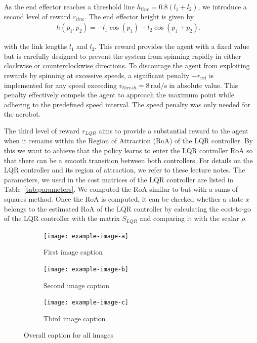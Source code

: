 As the end effector reaches a threshold line \(h_{line} = 0.8(l_1+l_2)\), we
introduce a second level of reward \(r_{line}\). The end effector height is
given by
\begin{align}
    h(p_1, p_2) = -l_1\cos(p_1) - l_2 \cos(p_1 + p_2).
\end{align}

with the link lengths $l_1$ and $l_2$.
This reward provides the agent with a fixed value
but is carefully designed to prevent the system from spinning rapidly in either
clockwise or counterclockwise directions. To discourage the agent from
exploiting rewards by spinning at excessive speeds, a significant penalty
\(-r_{vel}\) is implemented for any speed exceeding $v_{thresh}=8\,
\text{rad}/\text{s}$ in absolute value.
This penalty effectively compels the agent to approach the maximum point while
adhering to the predefined speed interval. The speed penalty was only needed for
the acrobot.

The third level of reward $r_{LQR}$ aims to provide a substantial reward to the
agent when it remains within the Region of Attraction (RoA) of the LQR
controller. By this we want to achieve that the policy learns to enter the LQR
controller RoA so that there can be a smooth transition between both
controllers. For details on the LQR controller and its region of attraction, we
refer to these lecture notes. The parameters, we used in
the cost matrices of the LQR controller are listed in
Table~\ref{tab:parameters}. We computed the RoA similar to
but with a sums of squares method.  Once the RoA is computed,
it can be checked whether a state $x$ belongs to the estimated RoA of the LQR
controller by calculating the cost-to-go of the LQR controller with the matrix
$S_{LQR}$ and comparing it with the scalar $\rho$.

\begin{figure}[htb!]
    \centering
    \begin{subfigure}{.3\textwidth}
        \centering
        \texttt{[image: example-image-a]}
        \caption{First image caption}
    \end{subfigure}%
    \hfill %
    \begin{subfigure}{.3\textwidth}
        \centering
        \texttt{[image: example-image-b]}
        \caption{Second image caption}
    \end{subfigure}%
    \hfill
    \begin{subfigure}{.3\textwidth}
        \centering
        \texttt{[image: example-image-c]}
        \caption{Third image caption}
    \end{subfigure}
    \caption{Overall caption for all images}
\end{figure}

\cleardoublepage
